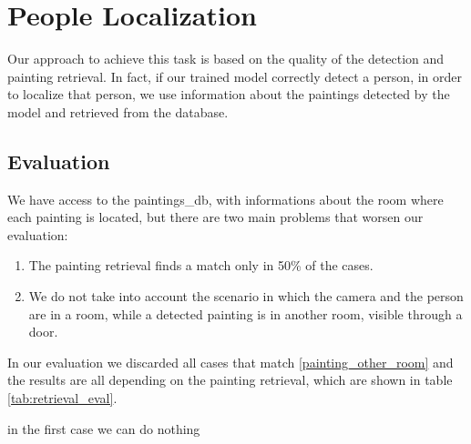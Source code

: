 \section{People Localization}
Our approach to achieve this task is based on the quality of the detection and painting retrieval. In fact, if our trained model correctly detect a person, in order to localize that person, we use information about the paintings detected by the model and retrieved from the database.

\subsection{Evaluation}
We have access to the paintings\_db, with informations about the room where each painting is located, but there are two main problems that worsen our evaluation:

\begin{enumerate}[label=\alph*)]
    \item \label{retrieval_case} The painting retrieval finds a match only in 50\% of the cases.
    \item \label{painting_other_room} We do not take into account the scenario in which the camera and the person are in a room, while a detected painting is in another room, visible through a door.
\end{enumerate}

In our evaluation we discarded all cases that match \ref*{painting_other_room} and the results are all depending on the painting retrieval, which are shown in table \ref*{tab:retrieval_eval}.

in the first case we can do nothing